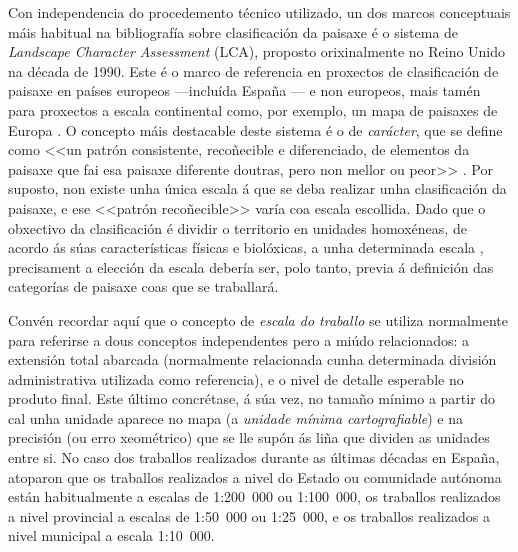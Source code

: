 \documentclass[11pt,a4paper]{article}
\begin{document}
Con independencia do procedemento técnico utilizado, un dos marcos conceptuais máis habitual na bibliografía sobre clasificación da paisaxe é o sistema de \emph{Landscape Character Assessment} (LCA), proposto orixinalmente no Reino Unido na década de 1990. Este é o marco de referencia en proxectos de clasificación de paisaxe en países europeos ---incluída España \citep{Valles2013}--- e non europeos, mais tamén para proxectos a escala continental como, por exemplo, un mapa de paisaxes de Europa \citep{Wascher2005,Mucher201087}. O concepto máis destacable deste sistema é o de \emph{carácter}, que se define como <<un patrón consistente, recoñecible e diferenciado, de elementos da paisaxe que fai esa paisaxe diferente doutras, pero non mellor ou peor>> \citep{TheCountrysideAgency2002}. Por suposto, non existe unha única escala á que se deba realizar unha clasificación da paisaxe, e ese <<patrón recoñecible>> varía coa escala escollida. Dado que o obxectivo da clasificación é dividir o territorio en unidades homoxéneas, de acordo ás súas características físicas e biolóxicas, a unha determinada escala \citep{Capotorti2012174}, precisament a elección da escala debería ser, polo tanto, previa á definición das categorías de paisaxe coas que se traballará.

Convén recordar aquí que o concepto de \emph{escala do traballo} se utiliza normalmente para referirse a dous conceptos independentes pero a miúdo relacionados: a extensión total abarcada (normalmente relacionada cunha determinada división administrativa utilizada como referencia), e o nivel de detalle esperable no produto final. Este último concrétase, á súa vez, no tamaño mínimo a partir do cal unha unidade aparece no mapa (a \emph{unidade mínima cartografiable}) e na precisión (ou erro xeométrico) que se lle supón ás liña que dividen as unidades entre si. No caso dos traballos realizados durante as últimas décadas en España, \citet{Valles2013} atoparon que os traballos realizados a nivel do Estado ou comunidade autónoma están habitualmente a escalas de 1:200~000 ou 1:100~000, os traballos realizados a nivel provincial a escalas de 1:50~000 ou 1:25~000, e os traballos realizados a nivel municipal a escala 1:10~000. 


\end{document}
